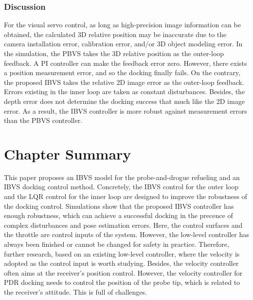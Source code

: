 \subsubsection{Discussion}


For the visual servo control, as long as high-precision image information can be obtained, the calculated 3D relative position may be inaccurate due to the camera installation error, calibration error, and/or 3D object modeling error. In the simulation, the PBVS takes the 3D relative position as the outer-loop feedback. A PI controller can make the feedback error zero. However, there exists a position measurement error, and so the docking finally fails. On the contrary, the proposed IBVS takes the relative 2D image error as the outer-loop feedback. Errors existing in the inner loop are taken as constant disturbances. Besides, the depth error does not determine the docking success that much like the 2D image error. As a result, the IBVS controller is more robust against measurement errors than the PBVS controller. 



\section{Chapter Summary}
This paper proposes an IBVS model for the probe-and-drogue refueling and an IBVS docking control method. Concretely, the IBVS control for the outer loop and the LQR control for the inner loop are designed to improve the robustness of the docking control. Simulations show that the proposed IBVS controller has enough robustness, which can achieve a successful docking in the precence of complex disturbances and pose estimation errors. Here, the control surfaces and the throttle are control inputs of the system. However, the low-level controller has always been finished or cannot be changed for safety in practice. Therefore, further research, based on an existing low-level controller,  where the velocity is adopted as the control input is worth studying. Besides, the velocity controller often aims at the receiver's position control. However, the velocity controller for PDR docking needs to control the position of the probe tip, which is related to the receiver's attitude. This is full of challenges.